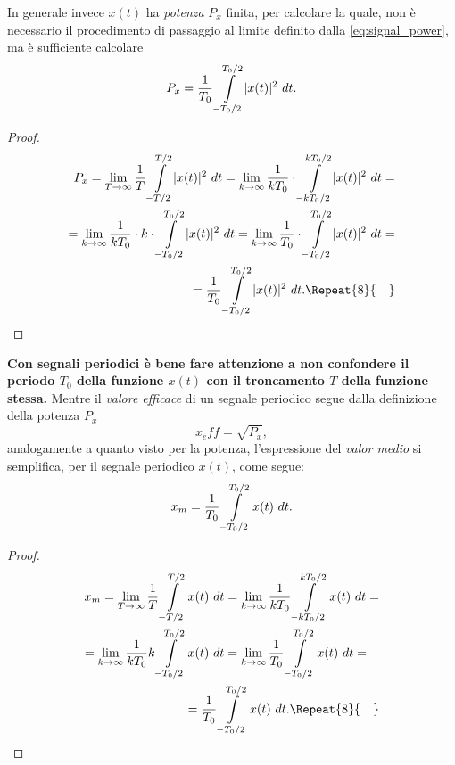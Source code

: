 \documentclass[12pt,oneside,openany]{memoir}
\numberwithin{equation}{subsection}
\DeclarePairedDelimiter{\abs}{\lvert}{\rvert}
\newcommand{\quads}[1]{\Repeat{#1}{\quad}}
\newcommand{\dt}{\ dt}
\begin{document}
In generale invece $x(t)$ ha \textit{potenza} $P_x$ finita, per calcolare la quale, non \`e necessario il procedimento di passaggio al limite definito dalla \eqref{eq:signal_power}, ma \`e sufficiente calcolare
\begin{equation}
	P_x = \frac{1}{T_0} \int\displaylimits_{-T_0/2}^{T_0/2} \abs{x(t)}^2 \dt.
\end{equation}
\begin{proof}
\begin{equation}
\begin{split}
	P_x = \lim_{T \rightarrow \infty} \frac{1}{T} \int\displaylimits_{-T/2}^{T/2} \abs{x(t)}^2 \dt = \lim_{k \rightarrow \infty} \frac{1}{kT_0} \cdot \int\displaylimits_{-kT_0/2}^{kT_0/2} \abs{x(t)}^2 \dt =
	\\
	= \lim_{k \rightarrow \infty} \frac{1}{kT_0} \cdot k \cdot \int\displaylimits_{-T_0/2}^{T_0/2} \abs{x(t)}^2 \dt = \lim_{k \rightarrow \infty} \frac{1}{T_0} \cdot \int\displaylimits_{-T_0/2}^{T_0/2} \abs{x(t)}^2 \dt =
	\\
	= \frac{1}{T_0} \int\displaylimits_{-T_0/2}^{T_0/2} \abs{x(t)}^2 \dt.
	\quads{8}
\end{split}
\end{equation}
\end{proof}
\textbf{Con segnali periodici \`e bene fare attenzione a non confondere il periodo $T_0$ della funzione $x(t)$ con il troncamento $T$ della funzione stessa.}
\bigbreak
Mentre il \textit{valore efficace} di un segnale periodico segue dalla definizione della potenza $P_x$
\begin{equation}
	x_eff = \sqrt{P_x},
\end{equation}
analogamente a quanto visto per la potenza, l'espressione del \textit{valor medio} si semplifica, per il segnale periodico $x(t)$, come segue:
\begin{equation}
	x_m = \frac{1}{T_0} \int\displaylimits_{-T_0/2}^{T_0/2} x(t) \dt.
\end{equation}
\begin{proof}
\begin{equation}
\begin{split}
	x_m = \lim_{T \rightarrow \infty} \frac{1}{T} \int\displaylimits_{-T/2}^{T/2} x(t) \dt = \lim_{k \rightarrow \infty} \frac{1}{kT_0} \int\displaylimits_{-kT_0/2}^{kT_0/2} x(t) \dt =
	\\
	= \lim_{k \rightarrow \infty} \frac{1}{kT_0} k \int\displaylimits_{-T_0/2}^{T_0/2} x(t) \dt = \lim_{k \rightarrow \infty} \frac{1}{T_0} \int\displaylimits_{-T_0/2}^{T_0/2} x(t) \dt =
	\quad
	\\
	= \frac{1}{T_0} \int\displaylimits_{-T_0/2}^{T_0/2} x(t) \dt.
	\quads{8}
\end{split}
\end{equation}
\end{proof}
\end{document}
